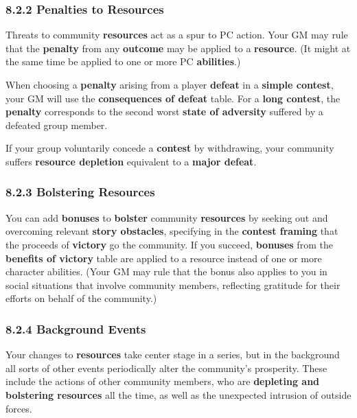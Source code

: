 \documentclass[
]{article}
\begin{document}
\hypertarget{penalties-to-resources}{%
\subsubsection{8.2.2 Penalties to
Resources}\label{penalties-to-resources}}

Threats to community \textbf{resources} act as a spur to PC action. Your
GM may rule that the \textbf{penalty} from any \textbf{outcome} may be
applied to a \textbf{resource}. (It might at the same time be applied to
one or more PC \textbf{abilities}.)

When choosing a \textbf{penalty} arising from a player \textbf{defeat}
in a \textbf{simple contest}, your GM will use the \textbf{consequences
of defeat} table. For a \textbf{long contest}, the \textbf{penalty}
corresponds to the second worst \textbf{state of adversity} suffered by
a defeated group member.

If your group voluntarily concede a \textbf{contest} by withdrawing,
your community suffers \textbf{resource depletion} equivalent to a
\textbf{major defeat}.

\hypertarget{bolstering-resources}{%
\subsubsection{8.2.3 Bolstering Resources}\label{bolstering-resources}}

You can add \textbf{bonuses} to \textbf{bolster} community
\textbf{resources} by seeking out and overcoming relevant \textbf{story
obstacles}, specifying in the \textbf{contest framing} that the proceeds
of \textbf{victory} go the community. If you succeed, \textbf{bonuses}
from the \textbf{benefits of victory} table are applied to a resource
instead of one or more character abilities. (Your GM may rule that the
bonus also applies to you in social situations that involve community
members, reflecting gratitude for their efforts on behalf of the
community.)

\hypertarget{background-events}{%
\subsubsection{8.2.4 Background Events}\label{background-events}}

Your changes to \textbf{resources} take center stage in a series, but in
the background all sorts of other events periodically alter the
community's prosperity. These include the actions of other community
members, who are \textbf{depleting and bolstering resources} all the
time, as well as the unexpected intrusion of outside forces.
\end{document}
